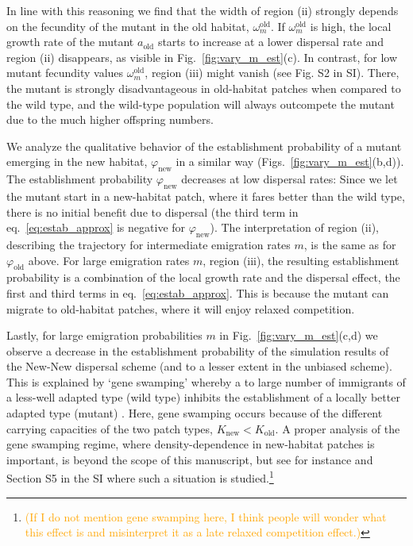 \documentclass[11pt]{article}
\newcommand{\pete}[1]{\textcolor{orange}{(#1)}}
\newcommand{\chg}[1]{\textcolor{change}{#1}}
\begin{document}
\chg{In line with this reasoning we find} that the width of region (ii) strongly depends on the fecundity of the mutant in the old habitat, $\omega^\text{old}_m$. If $\omega^\text{old}_m$ is high, the local growth rate of the mutant $a_{\text{old}}$ starts to increase at a lower dispersal rate 
\chg{and }region (ii) disappears, as visible in Fig.~\ref{fig:vary_m_est}(c). In contrast, for low mutant fecundity values $\omega^\text{old}_m$, region (iii) might vanish (see Fig. S2 in SI). There, the mutant is strongly disadvantageous in old-habitat patches when compared to the wild type, and the wild-type population will always outcompete the mutant due to the much higher offspring numbers.

We analyze the qualitative behavior of the establishment probability of a mutant emerging in the new habitat, $\varphi_{\text{new}}$ in a similar way (Figs.~\ref{fig:vary_m_est}(b,d)). The establishment probability $\varphi_{\text{new}}$ decreases at low dispersal rates: Since we let the mutant start in a new-habitat patch, where it fares better than the wild type, there is no initial benefit due to dispersal (the third term in eq.~\eqref{eq:estab_approx} is negative for $\varphi_{\text{new}}$). The interpretation of region (ii), describing the trajectory for intermediate emigration rates $m$, is the same as for $\varphi_{\text{old}}$ above. For large emigration rates $m$, region (iii), the resulting establishment probability is a combination of the local growth rate and the dispersal effect, the first and third terms in eq.~\eqref{eq:estab_approx}. This is because the mutant can migrate to old-habitat patches, where it will enjoy relaxed competition. %

\chg{Lastly, for large emigration probabilities $m$ in Fig.~\ref{fig:vary_m_est}(c,d) we observe a decrease in the establishment probability of the simulation results of the New-New dispersal scheme (and to a lesser extent in the unbiased scheme). This is explained by `gene swamping' whereby a to large number of immigrants of a less-well adapted type (wild type) inhibits the establishment of a locally better adapted type (mutant) \citep{nagylaki_1978,lenormand_2002}. Here, gene swamping occurs because of the different carrying capacities of the two patch types, $K_{\text{new}}<K_{\text{old}}$. A proper analysis of the gene swamping regime, where density-dependence in new-habitat patches is important, is beyond the scope of this manuscript, but see for instance \citet{tomasini_2018} and Section S5 in the SI where such a situation is studied.}\footnote{\pete{If I do not mention gene swamping here, I think people will wonder what this effect is and misinterpret it as a late relaxed competition effect.}}
\end{document}
